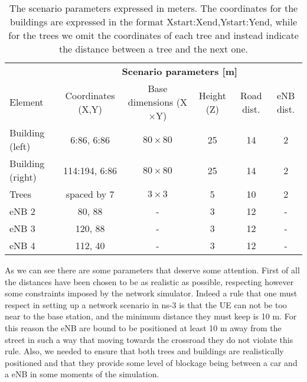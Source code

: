 \documentclass[conference,10pt]{IEEEtran}
\begin{document}
\begin{table*}[htbp]
	\begin{center}
		\begin{tabular}{p{2.7cm}ccccc}
			\toprule
			& \multicolumn{5}{c}{\textbf{Scenario parameters [m]}} \\
			\cmidrule(lr){2-6}
			Element          & Coordinates (X,Y) & Base dimensions (X$\times$Y)& Height (Z) & Road dist. & eNB dist. \\
			\midrule
			Building (left)  & 6:86, 6:86        & $80\times80$                & 25         & 14         & 2\\
			Building (right) & 114:194, 6:86     & $80\times80$                & 25         & 14         & 2\\
			Trees            & spaced by 7       & $3\times3$                  & 5          & 10         & 2\\
			eNB 2            & 80, 88            & -                           & 3          & 12         & - \\
			eNB 3            & 120, 88           & -                           & 3          & 12         & - \\
			eNB 4            & 112, 40           & -                           & 3          & 12         & - \\

			\bottomrule
		\end{tabular}
	\end{center}
	\label{tab:envdetails}
	\caption{The scenario parameters expressed in meters. The coordinates for the buildings are expressed in the format Xstart:Xend,Ystart:Yend, while for the trees we omit the coordinates of each tree and instead indicate the distance between a tree and the next one.}
\end{table*} 

\noindent As we can see there are some parameters that deserve some attention. First of all the distances have been chosen to be as realistic as possible, respecting however some constraints imposed by the network simulator. Indeed a rule that one must respect in setting up a network scenario in ns-3 is that the UE can not be too near to the base station, and the minimum distance they must keep is 10 m. For this reason the eNB are bound to be positioned at least 10 m away from the street in such a way that moving towards the crossroad they do not violate this rule. 
Also, we needed to ensure that both trees and buildings are realistically positioned and that they provide some level of blockage being between a car and a eNB in some moments of the simulation.
\end{document}
